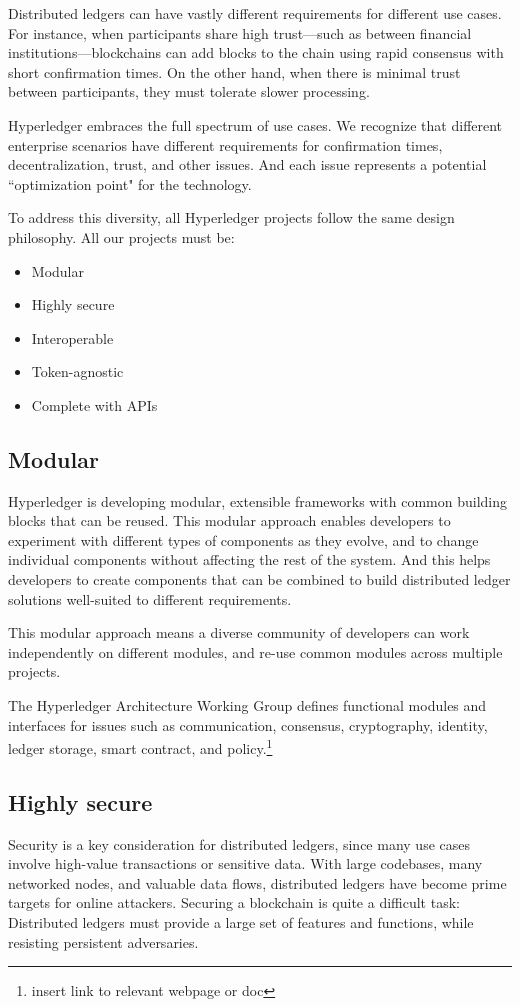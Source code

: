 Distributed ledgers can have vastly different requirements for different use cases. 
For instance, when participants share high trust---such as between financial institutions---blockchains can add blocks to the chain using rapid consensus with short confirmation times. 
On the other hand, when there is minimal trust between participants, they must tolerate slower processing.

Hyperledger embraces the full spectrum of use cases. 
We recognize that different enterprise scenarios have different requirements for confirmation times, decentralization, trust, and other issues. 
And each issue represents a potential ``optimization point" for the technology. 

To address this diversity, all Hyperledger projects follow the same design philosophy. All our projects must be:  
\begin{itemize}
\item Modular  
\item Highly secure 
\item Interoperable
\item Token-agnostic 
\item Complete with APIs
\end{itemize}

\subsection{Modular} 
Hyperledger is developing modular, extensible frameworks with common building blocks that can  be reused.
This modular approach enables developers to experiment with different types of components as they evolve, and to change individual components without affecting the rest of the system. 
And this helps developers to create components that can be combined to build distributed ledger solutions well-suited to different requirements. 

This modular approach means a diverse community of developers can work independently on different modules, and re-use common modules across multiple projects. 

The Hyperledger Architecture Working Group defines functional modules and interfaces for issues such as communication, consensus, cryptography, identity, ledger storage, smart contract, and policy.\footnote{insert link to relevant webpage or doc} 

\subsection{Highly secure}
Security is a key consideration for distributed ledgers, since many use cases involve high-value transactions or sensitive data.
With large codebases, many networked nodes, and valuable data flows, distributed ledgers have become prime targets for online attackers. 
Securing a blockchain is quite a difficult task: Distributed ledgers must provide a large set of features and functions, while resisting persistent adversaries. 

